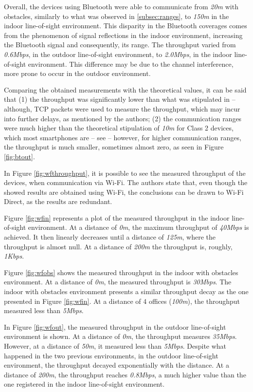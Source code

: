Overall, the devices using Bluetooth were able to communicate from \textit{20m} with obstacles, similarly to what was observed in \ref{subsec:ranges}, to \textit{150m} in the indoor line-of-sight environment. This disparity in the Bluetooth coverages comes from the phenomenon of signal reflections in the indoor environment, increasing the Bluetooth signal and consequently, its range. The throughput varied from \textit{0.6Mbps}, in the outdoor line-of-sight environment, to \textit{2.0Mbps}, in the indoor line-of-sight environment. This difference may be due to the channel interference, more prone to occur in the outdoor environment. 

Comparing the obtained measurements with the theoretical values, it can be said that (1) the throughput was significantly lower than what was stipulated in \cite{bluetoothspec} -- although, \gls{TCP} packets were used to measure the throughput, which may incur into further delays, as mentioned by the authors; (2) the communication ranges were much higher than the theoretical stipulation of \textit{10m} for Class 2 devices, which most smartphones are -- see \cite{bluetoothspec} -- however, for higher communication ranges, the throughput is much smaller, sometimes almost zero, as seen in Figure \ref{fig:btout}.

In Figure \ref{fig:wfthroughput}, it is possible to see the measured throughput of the devices, when communication via Wi-Fi. The authors state that, even though the showed results are obtained using Wi-Fi, the conclusions can be drawn to Wi-Fi Direct, as the results are redundant.

Figure \ref{fig:wfin} represents a plot of the measured throughput in the indoor line-of-sight environment. At a distance of \textit{0m}, the maximum throughput of \textit{40Mbps} is achieved. It then linearly decreases until a distance of \textit{125m}, where the throughput is almost null. At a distance of \textit{200m} the throughput is, roughly, \textit{1Kbps}.

Figure \ref{fig:wfobs} shows the measured throughput in the indoor with obstacles environment. At a distance of \textit{0m}, the measured throughput is \textit{30Mbps}. The indoor with obstacles environment presents a similar throughput decay as the one presented in Figure \ref{fig:wfin}. At a distance of 4 offices (\textit{100m}), the throughput measured less than \textit{5Mbps}.

In Figure \ref{fig:wfout}, the measured throughput in the outdoor line-of-sight environment is shown. At a distance of \textit{0m}, the throughput measures \textit{35Mbps}. However, at a distance of \textit{50m}, it measured less than \textit{5Mbps}. Despite what happened in the two previous environments, in the outdoor line-of-sight environment, the throughput decayed exponentially with the distance. At a distance of \textit{200m}, the throughput reaches \textit{0.8Mbps}, a much higher value than the one registered in the indoor line-of-sight environment.

